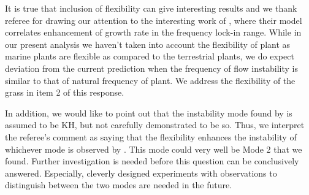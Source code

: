 \documentclass[letterpaper,10pt]{article}
\begin{document}
\begin{enumerate}
It is true that inclusion of flexibility can give interesting results and we thank referee for drawing our attention to the interesting work of \cite{Gosselin2009}, where their model correlates enhancement of growth rate in the frequency lock-in range. 
While in our present analysis we haven't taken into account the flexibility of plant as marine plants are flexible as compared to the terrestrial plants, we do expect deviation from the current prediction when the frequency of flow {\color{red}instability} is similar to that of natural frequency of plant.  
We address the flexibility of the grass in item 2 of this response.

In addition, we would like to point out that the instability mode found by \cite{Gosselin2009} is assumed to be KH, but not carefully demonstrated to be so.
Thus, we interpret the referee's comment as saying that the flexibility enhances the instability of whichever mode is observed by \cite{Gosselin2009}. 
This mode could very well be Mode 2 that we found. 
Further investigation is needed before this question can be conclusively answered.
Especially, cleverly designed experiments with observations to distinguish between the two modes are needed in the future.

\end{enumerate}
\end{document}
